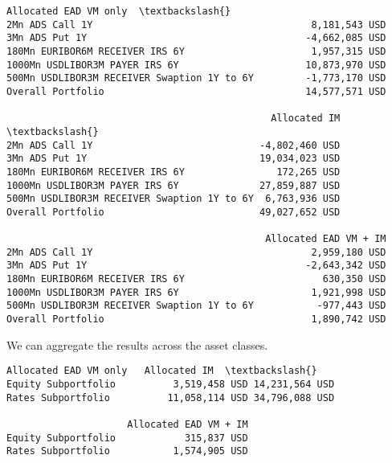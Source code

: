 \documentclass[11pt]{article}
\makeatletter
\newcommand{\boxspacing}{\kern\kvtcb@left@rule\kern\kvtcb@boxsep}
\newcommand{\prompt}[4]{
        \ttfamily\llap{{\color{#2}[#3]:\hspace{3pt}#4}}\vspace{-\baselineskip}
    }
\makeatother
\begin{document}
            \begin{tcolorbox}[breakable, size=fbox, boxrule=.5pt, pad at break*=1mm, opacityfill=0]
\prompt{Out}{outcolor}{6}{\boxspacing}
\begin{Verbatim}[commandchars=\\\{\}]
                                             Allocated EAD VM only  \textbackslash{}
2Mn ADS Call 1Y                                      8,181,543 USD
3Mn ADS Put 1Y                                      -4,662,085 USD
180Mn EURIBOR6M RECEIVER IRS 6Y                      1,957,315 USD
1000Mn USDLIBOR3M PAYER IRS 6Y                      10,873,970 USD
500Mn USDLIBOR3M RECEIVER Swaption 1Y to 6Y         -1,773,170 USD
Overall Portfolio                                   14,577,571 USD

                                              Allocated IM  \textbackslash{}
2Mn ADS Call 1Y                             -4,802,460 USD
3Mn ADS Put 1Y                              19,034,023 USD
180Mn EURIBOR6M RECEIVER IRS 6Y                172,265 USD
1000Mn USDLIBOR3M PAYER IRS 6Y              27,859,887 USD
500Mn USDLIBOR3M RECEIVER Swaption 1Y to 6Y  6,763,936 USD
Overall Portfolio                           49,027,652 USD

                                             Allocated EAD VM + IM
2Mn ADS Call 1Y                                      2,959,180 USD
3Mn ADS Put 1Y                                      -2,643,342 USD
180Mn EURIBOR6M RECEIVER IRS 6Y                        630,350 USD
1000Mn USDLIBOR3M PAYER IRS 6Y                       1,921,998 USD
500Mn USDLIBOR3M RECEIVER Swaption 1Y to 6Y           -977,443 USD
Overall Portfolio                                    1,890,742 USD
\end{Verbatim}
\end{tcolorbox}
        
    We can aggregate the results across the asset classes.

            \begin{tcolorbox}[breakable, size=fbox, boxrule=.5pt, pad at break*=1mm, opacityfill=0]
\prompt{Out}{outcolor}{8}{\boxspacing}
\begin{Verbatim}[commandchars=\\\{\}]
                     Allocated EAD VM only   Allocated IM  \textbackslash{}
Equity Subportfolio          3,519,458 USD 14,231,564 USD
Rates Subportfolio          11,058,114 USD 34,796,088 USD

                     Allocated EAD VM + IM
Equity Subportfolio            315,837 USD
Rates Subportfolio           1,574,905 USD
\end{Verbatim}
\end{tcolorbox}
        
\end{document}

